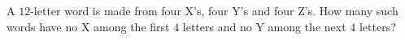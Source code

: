 A $12$-letter word is made from four X's, four Y's and four Z's. How many such words have no X among the first $4$ letters and no Y among the next $4$ letters?
